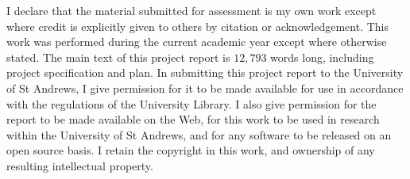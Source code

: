 I declare that the material submitted for assessment is my own work except where credit is explicitly given to others by citation or acknowledgement. This work was performed during the current academic year except where otherwise stated. The main text of this project report is $12,793$  words long, including project specification and plan. In submitting this project report to the University of St Andrews, I give permission for it to be made available for use in accordance with the regulations of the University Library. I also give permission for the report to be made available on the Web, for this work to be used in research within the University of St Andrews, and for any software to be released on an open source basis. I retain the copyright in this work, and ownership of any resulting intellectual property.
